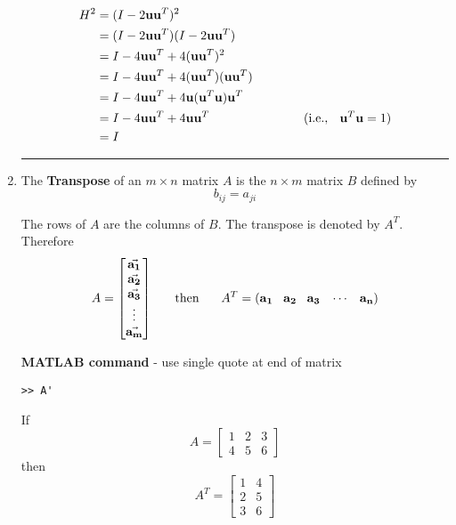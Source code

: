 \begin{enumerate}
\begin{example}
	\proof 
	\begin{align*}
		H^2 &= (I - 2 {\bf u}{\bf u}^T)^2\\
			&= (I - 2 {\bf u}{\bf u}^T)(I - 2 {\bf u}{\bf u}^T) \\
			&= I -4{\bf u}{\bf u}^T + 4({\bf u}{\bf u}^T)^2 \\
			&=I - 4{\bf u}{\bf u}^T + 4({\bf u}{\bf u}^T)({\bf u}{\bf u}^T) \\
			&= I- 4{\bf u}{\bf u}^T + 4{\bf u}({\bf u}^T {\bf u}){\bf u}^T \\
			&= I - 4{\bf u}{\bf u}^T + 4{\bf u}{\bf u}^T   \hspace{1.0in} \text{ (i.e., \; } {\bf u}^T {\bf u} = 1)\\
			&= I
	\end{align*}
\end{example}
\rule[0.01in]{\textwidth}{0.0025in}















\item The \textbf{Transpose} of an $m \times n$ matrix $A$ is the $n \times m$ matrix $B$ defined by
\[ b_{ij} = a_{ji} \]

The rows of $A$ are the columns of $B$.  The transpose is denoted by $A^T$.
Therefore
 $$A = \begin{bmatrix} \vec{{\bf a_1}}\\ \vec{{\bf a_2}} \\ \vec{{\bf a_3}} \\ \vdots \\ \vec{{\bf a_m}} \end{bmatrix}     \hspace{0.5cm} \text{ then } \hspace{0.5cm}      A^T=({\bf a_1} \;\; \;{\bf a_2} \; \;\; {\bf a_3} \; \;\; \cdots \; \;\; {\bf a_n})$$

\textbf{MATLAB command} - use single quote at end of matrix
\begin{verbatim}
>> A'
\end{verbatim}

\begin{example}
If  \[ A = \begin{bmatrix} 1 & 2 &3 \\ 4 & 5 & 6 \end{bmatrix} \]
then
\[ A^T = \begin{bmatrix} 1 & 4  \\ 2 & 5 \\ 3 & 6 \end{bmatrix} \]
 \end{example}
 

\end{enumerate}
